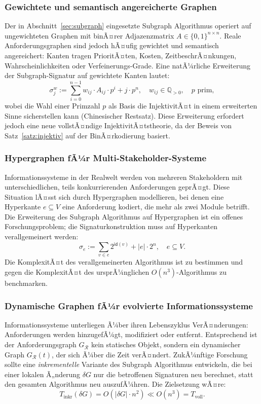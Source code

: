 ﻿\documentclass[a4paper,12pt]{article}
\theoremstyle{definition}
\begin{document}
\subsubsection{Gewichtete und semantisch angereicherte Graphen}

Der in Abschnitt~\ref{sec:subgraph} eingesetzte Subgraph Algorithmus operiert auf
ungewichteten Graphen mit binÃ¤rer Adjazenzmatrix $A \in \{0,1\}^{n \times n}$.
Reale Anforderungsgraphen sind jedoch hÃ¤ufig gewichtet und semantisch angereichert:
Kanten tragen PrioritÃ¤ten, Kosten, ZeitbeschrÃ¤nkungen, Wahrscheinlichkeiten
oder Verfeinerungs-Grade. Eine natÃ¼rliche Erweiterung der Subgraph-Signatur auf
gewichtete Kanten lautet:
\[
  \sigma_j^w := \sum_{i=0}^{n-1} w_{ij} \cdot A_{ij} \cdot p^i + j \cdot p^n,
  \quad w_{ij} \in \mathbb{Q}_{>0}, \quad p \text{ prim},
\]
wobei die Wahl einer Primzahl $p$ als Basis die InjektivitÃ¤t in einem erweiterten
Sinne sicherstellen kann (Chinesischer Restsatz). Diese Erweiterung erfordert jedoch
eine neue vollstÃ¤ndige InjektivitÃ¤tstheorie, da der Beweis von Satz~\ref{satz:injektiv}
auf der BinÃ¤rkodierung basiert.

\subsubsection{Hypergraphen fÃ¼r Multi-Stakeholder-Systeme}

Informationssysteme in der Realwelt werden von mehreren Stakeholdern mit
unterschiedlichen, teils konkurrierenden Anforderungen geprÃ¤gt. Diese Situation
lÃ¤sst sich durch Hypergraphen modellieren, bei denen eine Hyperkante
$e \subseteq V$ eine Anforderung kodiert, die mehr als zwei Module betrifft.
Die Erweiterung des Subgraph Algorithmus auf Hypergraphen ist ein offenes
Forschungsproblem; die Signaturkonstruktion muss auf Hyperkanten verallgemeinert
werden:
\[
  \sigma_e := \sum_{v \in e} 2^{\mathsf{id}(v)} + |e| \cdot 2^n, \quad e \subseteq V.
\]
Die KomplexitÃ¤t des verallgemeinerten Algorithmus ist zu bestimmen und gegen die
KomplexitÃ¤t des ursprÃ¼nglichen $O(n^3)$-Algorithmus zu benchmarken.

\subsubsection{Dynamische Graphen fÃ¼r evolvierte Informationssysteme}

Informationssysteme unterliegen Ã¼ber ihren Lebenszyklus VerÃ¤nderungen: Anforderungen
werden hinzugefÃ¼gt, modifiziert oder entfernt. Entsprechend ist der Anforderungsgraph
$G_\mathcal{R}$ kein statisches Objekt, sondern ein dynamischer Graph
$G_\mathcal{R}(t)$, der sich Ã¼ber die Zeit verÃ¤ndert. ZukÃ¼nftige Forschung sollte
eine \emph{inkrementelle} Variante des Subgraph Algorithmus entwickeln, die bei einer
lokalen Ã„nderung $\delta G$ nur die betroffenen Signaturen neu berechnet, statt den
gesamten Algorithmus neu auszufÃ¼hren. Die Zielsetzung wÃ¤re:
\[
  T_{\text{inkr}}(\delta G) = O(|\delta G| \cdot n^2) \ll O(n^3) = T_{\text{voll}}.
\]
\end{document}
